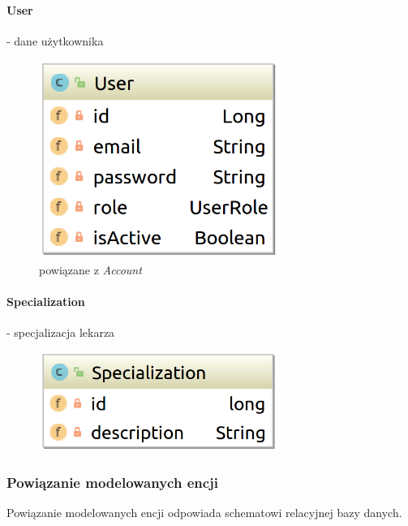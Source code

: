 \documentclass[polish,12pt]{aghthesis}
\begin{document}
    \paragraph{User} - dane użytkownika 
    \begin{figure}[H]
    \includegraphics[width=0.7\textwidth]{User}
    \caption{powiązane z \emph{Account}}
    \end{figure}
    \paragraph{Specialization} - specjalizacja lekarza 
    \begin{figure}[H]
    \includegraphics[width=0.7\textwidth]{Specialization}
    \end{figure}
\subsubsection{Powiązanie modelowanych encji}
Powiązanie modelowanych encji odpowiada schematowi relacyjnej bazy danych.
\end{document}
